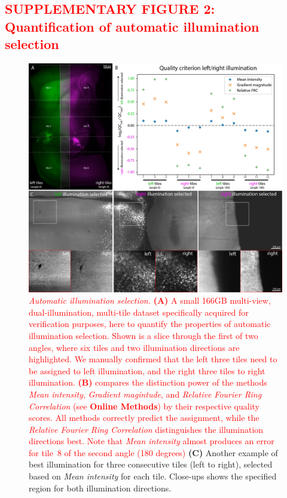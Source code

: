 \documentclass[]{spie}  %
\def\red{\textcolor{red}}
\begin{document}
\pagebreak

\subsection*{\red{SUPPLEMENTARY FIGURE 2: Quantification of automatic illumination selection}}
\vspace{1mm}
\begin{figure}[h!]
\includegraphics[width=\textwidth]{fig-Illumination-Select.jpg}
\vspace{-2.0mm}
\caption{\hspace{-0.5mm} \red{\emph{Automatic illumination selection.} \textbf{(A)} A small 166GB multi-view, dual-illumination, multi-tile dataset specifically acquired for verification purposes, here to quantify the properties of automatic illumination selection. Shown is a slice through the first of two angles, where six tiles and two illumination directions are highlighted. We manually confirmed that the left three tiles need to be assigned to left illumination, and the right three tiles to right illumination. \textbf{(B)} compares the distinction power of the methods \emph{Mean intensity}, \emph{Gradient magintude}, and \emph{Relative Fourier Ring Correlation} (see \textbf{Online Methods}) by their respective quality scores. All methods correctly predict the assignment, while the \emph{Relative Fourier Ring Correlation} distinguishes the illumination directions best. Note that \emph{Mean intensity} almost produces an error for tile~8 of the second angle (180 degrees)} \textbf{(C)} Another example of best illumination for three consecutive tiles (left to right), selected based on \emph{Mean intensity} for each tile. Close-ups shows the specified region for both illumination directions.
}
\label{fig:sup-fig-illu-select}
\end{figure}
\end{document}
